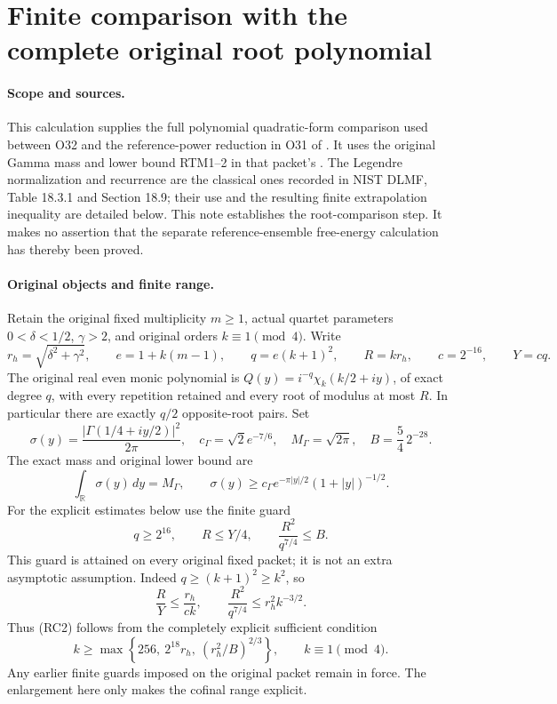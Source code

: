 \clearpage
\begingroup


\setcounter{equation}{0}
\renewcommand{\theequation}{RC.\arabic{equation}}
\section*{Finite comparison with the complete original root polynomial}






\paragraph{Scope and sources.}
This calculation supplies the full polynomial quadratic-form comparison
used between O32 and the reference-power reduction in O31 of
.
It uses the original Gamma mass and lower bound RTM1--2 in that packet's
.
The Legendre normalization and recurrence are the classical ones recorded
in NIST DLMF, Table 18.3.1 and Section 18.9; their use and the resulting
finite extrapolation inequality are detailed below.
This note establishes the root-comparison step. It makes no assertion
that the separate reference-ensemble free-energy calculation has thereby
been proved.

\paragraph{Original objects and finite range.}
Retain the original fixed multiplicity $m\geq1$, actual quartet parameters
$0<\delta<1/2$, $\gamma>2$, and original orders $k\equiv1\pmod4$.
Write
\[
 r_h=\sqrt{\delta^2+\gamma^2},\qquad
 e=1+k(m-1),\qquad q=e(k+1)^2,\qquad R=kr_h,\qquad
 c=2^{-16},\qquad Y=cq.
\]
The original real even monic polynomial is
$Q(y)=i^{-q}\chi_k(k/2+iy)$, of exact degree $q$, with every
repetition retained and every root of modulus at most $R$.
In particular there are exactly $q/2$ opposite-root pairs.
Set
\[
 \sigma(y)=\frac{|\Gamma(1/4+iy/2)|^2}{2\pi},\quad
 c_\Gamma=\sqrt2 e^{-7/6},\quad M_\Gamma=\sqrt{2\pi},\quad
 B=\frac54\,2^{-28}.
\]
The exact mass and original lower bound are
\[
 \int_{\mathbb R}\sigma(y)\,dy=M_\Gamma,\qquad
 \sigma(y)\geq c_\Gamma e^{-\pi|y|/2}(1+|y|)^{-1/2}.
 \tag{RC1}
\]
For the explicit estimates below use the finite guard
\[
 q\geq2^{16},\qquad R\leq Y/4,\qquad
 \frac{R^2}{q^{7/4}}\leq B.                         \tag{RC2}
\]
This guard is attained on every original fixed packet; it is not an
extra asymptotic assumption. Indeed $q\geq(k+1)^2\geq k^2$, so
\[
 \frac RY\leq\frac{r_h}{ck},\qquad
 \frac{R^2}{q^{7/4}}\leq r_h^2 k^{-3/2}.
\]
Thus (RC2) follows from the completely explicit sufficient condition
\[
 k\geq
 \max\left\{256,\ 2^{18}r_h,\
                 (r_h^2/B)^{2/3}\right\},
 \qquad k\equiv1\pmod4.                           \tag{RC3}
\]
Any earlier finite guards imposed on the original packet remain in force.
The enlargement here only makes the cofinal range explicit.

